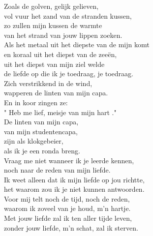 \begin{translation}
Zoals de golven, gelijk gelieven,\\
vol vuur het zand van de stranden kussen,\\
zo zullen mijn kussen de warmte\\
van het strand van jouw lippen zoeken.\\
Als het metaal uit het diepste van de mijn komt\\
en koraal uit het diepst van de zeeën,\\
uit het diepst van mijn ziel welde\\
de liefde op die ik je toedraag, je toedraag.\\

Zich verstrikkend in de wind,\\
wapperen de linten van mijn capa.\\
En in koor zingen ze:\\
" Heb me lief, meisje van mijn hart ."\\
De linten van mijn capa,\\
van mijn studentencapa,\\
zijn als klokgebeier,\\
als ik je een ronda breng.\\
Vraag me niet wanneer ik je leerde kennen,\\
noch naar de reden van mijn liefde.\\
Ik weet alleen dat ik mijn liefde op jou richtte,\\
het waarom zou ik je niet kunnen antwoorden.\\
Voor mij telt noch de tijd, noch de reden,\\
waarom ik zoveel van je houd, m'n hartje.\\
Met jouw liefde zal ik ten aller tijde leven,\\
zonder jouw liefde, m'n schat, zal ik sterven.
\end{translation}
